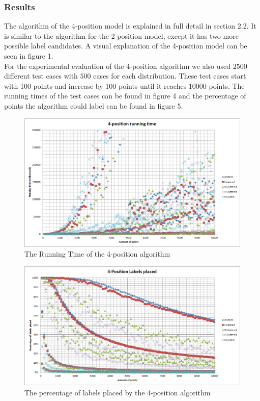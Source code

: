 \documentclass[crop=false,a4paper,oneside,11pt]{standalone}
\begin{document}
\subsubsection{Results}
The algorithm of the 4-position model is explained in full detail in section 2.2. It is similar to the algorithm for the 2-position model, except it has two more possible label candidates. A visual explanation of the 4-position model can be seen in figure 1.\\
 For the experimental evaluation of the 4-position algorithm we also used $2500$ different test cases with $500$ cases for each distribution. These test cases start with 100 points and increase by 100 points until it reaches 10000 points. The running times of the test cases can be found in figure 4 and the percentage of points the algorithm could label can be found in figure 5.\\

 \begin{figure}[H]
 \centering
 \centerline{\includegraphics[scale = 0.5]{4PosRunningTime.png}}
 \caption{The Running Time of the 4-position algorithm}
 \end{figure}

 \begin{figure}[H]
 \centering
  \centerline{\includegraphics[scale = 0.5]{4PosLabelsPlaced.png}}
  \caption{The percentage of labels placed by the 4-position algorithm}
 \end{figure}
\end{document}
